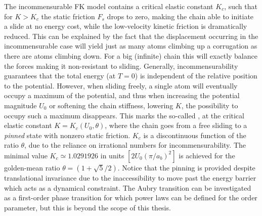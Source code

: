 
The incommensurable \acrshort{FK} model contains a critical elastic constant $K_c$, such that for $K > K_c$ the static friction $F_s$ drops to zero, making the chain able to initiate a slide at no energy cost, while the low-velocity kinetic friction is dramatically reduced. This can be explained by the
fact that the displacement occurring in the incommensurable case will yield just
as many atoms climbing up a corrugation as there are atoms climbing down. For a big (infinite) chain this will exactly balance the forces making it
non-resistant to sliding. Generally, incommensurability guarantees that the
total energy (at $T=0$) is independent of the relative position to the
potential. However, when sliding freely, a single atom will eventually occupy a
maximum of the potential, and thus when increasing the potential magnitude $U_0$ or
softening the chain stiffness, lowering $K$, the possibility to occupy such a
maximum disappears. This marks the so-called ,
at the critical elastic constant $K = K_c(U_0, \theta)$, where the chain goes
from a free sliding to a \textit{pinned} state with nonzero static friction.
$K_c$ is a discontinuous function of the ratio $\theta$, due to the reliance on
irrational numbers for incommensurability. The minimal
value $K_c \simeq 1.0291926 $ in units $[2 U_0 (\pi / a_b)^2]$ is achieved for
the golden-mean ratio $\theta = (1+\sqrt{5}/2)$. Notice that the pinning is
provided despite translational invariance due to the inaccessibility to move
past the energy barrier which acts as a dynamical constraint. The Aubry transition can be investigated as a first-order phase transition for which power laws can be defined for the order parameter, but this is beyond the scope of this thesis.




